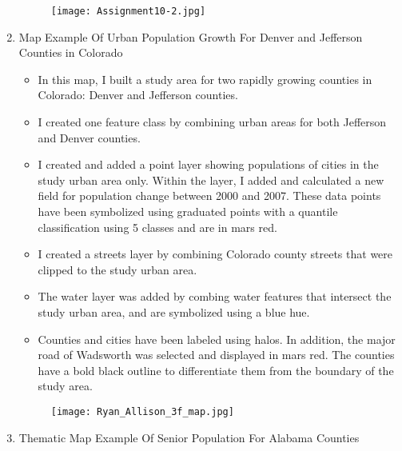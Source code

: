\documentclass{article}
\begin{document}
\begin{enumerate}
			
			\begin{figure}[H]
				\centering
				\texttt{[image: Assignment10-2.jpg]}
				\caption{}
				\label{fig:method}
				\end{figure}

\newpage	


\item Map Example Of Urban Population Growth For Denver and Jefferson Counties in Colorado
	\begin{itemize}
	\item In this map, I built a study area for two rapidly growing counties in Colorado: Denver and Jefferson counties. 
	\item I created one feature class by combining urban areas for both Jefferson and Denver counties.
	\item I created and added a point layer showing populations of cities in the study urban area only. Within the layer, I added and calculated a new field for population change between 2000 and 2007. These data points have been symbolized using graduated points with a quantile classification using 5 classes and are in mars red.
	\item I created a streets layer by combining Colorado county streets that were clipped to the study urban area.
	\item The water layer was added by combing water features that intersect the study urban area, and are symbolized using a blue hue.
	\item Counties and cities have been labeled using halos. In addition, the major road of Wadsworth was selected and displayed in mars red.  The counties have a bold black outline to differentiate them from the boundary of the study area. 



	\end{itemize}		
		
			
			\begin{figure}[H]
				\centering
				\texttt{[image: Ryan\_Allison\_3f\_map.jpg]}
				\caption{}
				\label{fig:method}
				\end{figure}
	
\newpage	

\item Thematic Map Example Of Senior Population For Alabama Counties




\end{enumerate}
\end{document}
